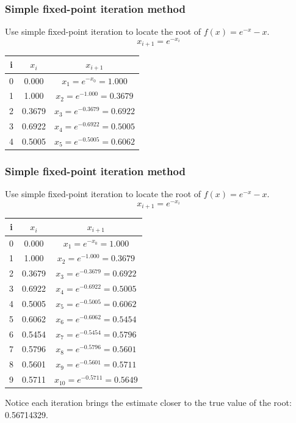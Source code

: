 \documentclass{if-beamer}
\begin{document}
\begin{frame}[t]
\frametitle{Simple fixed-point iteration method}
Use simple fixed-point iteration to locate the root of $f(x) = e^{-x}-x$.
$$x_{i+1} = e^{-x_i}$$
\begin{table}
\begin{tabular}{c | c | c}
i & $x_i$ & $x_{i+1}$ \\
\hline
0 & 0.000 & $x_1 = e^{-x_0} = 1.000$\\ 
1 & 1.000 & $x_2 = e^{-1.000}= 0.3679$ \\
2 & 0.3679 & $x_3 = e^{-0.3679} =  0.6922$ \\ 
3 & 0.6922 & $x_4 = e^{-0.6922} = 0.5005$ \\
4 & 0.5005 & $x_5 = e^{-0.5005} =  0.6062$\\	
\end{tabular}
\end{table}
\end{frame}

\begin{frame}[t]
\frametitle{Simple fixed-point iteration method}
Use simple fixed-point iteration to locate the root of $f(x) = e^{-x}-x$.
$$x_{i+1} = e^{-x_i}$$
\begin{table}
	\begin{tabular}{c | c | c}
		i & $x_i$ & $x_{i+1}$ \\
		\hline
		0 & 0.000 & $x_1= e^{-x_0} = 1.000$\\ 
		1 & 1.000 & $x_2 = e^{-1.000}= 0.3679$ \\
		2 & 0.3679 & $x_3 = e^{-0.3679} =  0.6922$ \\ 
		3 & 0.6922 & $x_4 = e^{-0.6922} = 0.5005$ \\
		4 & 0.5005 & $x_5 = e^{-0.5005} =  0.6062$\\	
		5 & 0.6062 & $x_6 = e^{-0.6062} = 0.5454$\\
		6 & 0.5454 & $x_7 = e^{-0.5454} = 0.5796$ \\
		7 & 0.5796 & $x_8 = e^{-0.5796} = 0.5601$ \\
		8 & 0.5601 & $x_9 = e^{-0.5601} = 0.5711$ \\
		9 & 0.5711 & $x_{10} =e^{-0.5711} = 0.5649$ 
	\end{tabular}
\end{table}

Notice each iteration brings the estimate closer to the true value of the root: 0.56714329.
\end{frame}
\end{document}
